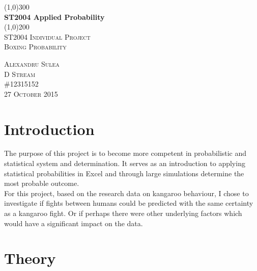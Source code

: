 \documentclass{article}
\begin{document}
\begin{titlepage}
	\begin{center}
	\line(1,0){300}\\
	[0.25in]
	\huge{\bfseries ST2004 Applied Probability}\\
	[2mm]
	\line(1,0){200}\\
	[1.5cm]
	\textsc{\LARGE ST2004 Individual Project }\\
	[0.75cm]
	\textsc{\Large Boxing Probability}\\
	[9cm]	
	\end{center}
	
	\begin{flushright}
	\textsc{\large Alexandru Sulea\\
	D Stream\\
	\#12315152\\
	27 October 2015\\}
	\end{flushright}

\end{titlepage}
\tableofcontents
\listoftables
{}


\thispagestyle{empty}
\cleardoublepage
{}
\setcounter{page}{1}


\section{Introduction}\label{sec:intro}
The purpose of this project is to become more competent in probabilistic and statistical system and determination. It serves as an introduction to applying statistical probabilities in Excel and through large simulations determine the most probable outcome.\\
For this project, based on the research data on kangaroo behaviour, I chose to investigate if fights between humans could be predicted with the same certainty as a kangaroo fight. Or if perhaps there were other underlying factors which would have a significant impact on the data.


\section{Theory}\label{sec:theory}
\end{document}
